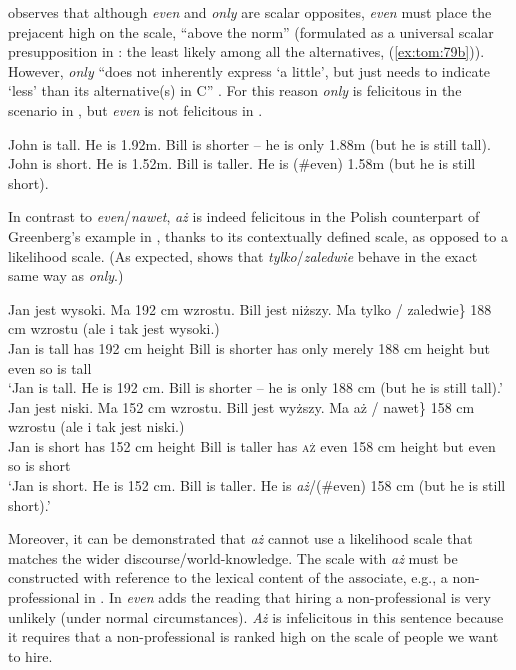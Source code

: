 \documentclass[output=paper,colorlinks,citecolor=brown]{langscibook}
\begin{document}
\noindent \citet{greenberg22} observes that although \textit{even} and \textit{only} are scalar opposites, \textit{even} must place the prejacent high on the scale, “above the norm” (formulated as a universal scalar presupposition in \citealt{guerzoni03}: the least likely among all the alternatives, (\ref{ex:tom:79b})). However, \textit{only} “does not inherently express ‘a little’, but just needs to indicate ‘less’ than its alternative(s) in C” \citep[23]{greenberg22}. For this reason \textit{only} is felicitous in the scenario in , but \textit{even} is not felicitous in .

\ea\label{ex:tom:Greenberg-52} 
\ea\label{ex:tom:Greenberg-52a}
John is tall. He is 1.92m. Bill is shorter -- he is only 1.88m (but he is still tall). \hfill \cite[(52a) p. 21]{greenberg22}
\ex\label{ex:tom:Greenberg-52b}
John is short. He is 1.52m. Bill is taller. He is (\#even) 1.58m (but he is still short). \hfill \cite[(52b) p. 21]{greenberg22}
\z
\z 

\noindent In contrast to \textit{even}/\textit{nawet}, \textit{aż} is indeed felicitous in the Polish counterpart of Greenberg’s example in , thanks to its contextually defined scale, as opposed to a likelihood scale. (As expected,  shows that \textit{tylko}/\textit{zaledwie} behave in the exact same way as \textit{only}.)

\ea\label{ex:tom:Greenberg-pl} 
\ea\label{ex:tom:Greenberg-pla}
\gll Jan jest wysoki. Ma 192 cm wzrostu. Bill jest niższy. Ma \minsp{\{} tylko / zaledwie\} 188 cm wzrostu (ale i tak jest wysoki.)\\
Jan is tall has 192 cm height Bill is shorter has {} only {} merely 188 cm height but even so is tall\\
\glt ‘Jan is tall. He is 192 cm. Bill is shorter -- he is only 188 cm (but he is still tall).’ 
\ex\label{ex:tom:Greenberg-plb}
\gll Jan jest niski. Ma 152 cm wzrostu. Bill jest wyższy. Ma \minsp{\{} aż / \minsp{\#} nawet\} 158 cm wzrostu (ale i tak jest niski.)\\
Jan is short has 152 cm height Bill is taller has {} \textsc{aż} {} {} even 158 cm height but even so is short \\
\glt ‘Jan is short. He is 152 cm. Bill is taller. He is \textit{aż}/(\#even) 158 cm (but he is still short).’ 
\z
\z 

\noindent Moreover, it can be demonstrated that \textit{aż} cannot use a likelihood scale that matches the wider discourse/world-knowledge. The scale with \textit{aż} must be constructed with reference to the lexical content of the associate, e.g., a non-pro\-fes\-sion\-al in . In  \textit{even} adds the reading that hiring a non-professional is very unlikely (under normal circumstances). \textit{Aż} is infelicitous in this sentence because it requires that a non-professional is ranked high on the scale of people we want to hire.
\end{document}
